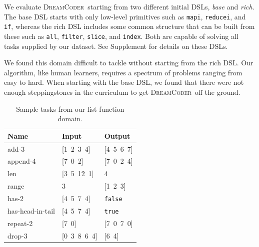 \documentclass{article}
\newcommand{\system}{\textsc{DreamCoder}~}
\newcommand{\code}[1]{{\footnotesize\texttt{#1}}}
\begin{document}
We evaluate \system starting from two different initial DSLs, \emph{base} and
\emph{rich}. The base DSL starts with only
low-level primitives such as \code{mapi}, \code{reducei}, and
\code{if}, whereas the rich DSL includes some common structure that can be
built from these such as \code{all}, \code{filter}, \code{slice}, and
\code{index}.
Both are capable of solving all tasks supplied by our dataset.
See Supplement for details on these DSLs.

We found  this domain  difficult to tackle without starting from 
the rich DSL. Our
algorithm, like human learners, requires a spectrum of problems ranging from
easy to hard.
When starting with the base DSL,
we found that there were not enough steppingstones in the curriculum to
get \system off the ground.


\begin{table}
\centering
\begin{tabular}{lll}
  \toprule
  Name & Input & Output \\\midrule
  add-3 & [1\, 2\, 3\, 4] & [4\, 5\, 6\, 7] \\
  append-4 & [7\, 0\, 2] & [7\, 0\, 2\, 4] \\
  len & [3\, 5\, 12\, 1] & 4 \\
  range & 3 & [1\, 2\, 3] \\
  has-2 & [4\, 5\, 7\, 4] & \code{false} \\
  has-head-in-tail & [4\, 5\, 7\, 4] & \code{true} \\
  repeat-2 & [7\, 0] & [7\, 0\, 7\, 0] \\
  drop-3 & [0\, 3\, 8\, 6\, 4] & [6\, 4] \\
  \bottomrule
\end{tabular}
\caption{Sample tasks from our list function domain. %
}
\label{listexamples}
\end{table}
\end{document}
